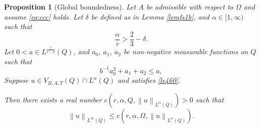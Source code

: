 \documentclass[11pt, a4paper]{article}
\newtheorem{proposition}[theorem]{Proposition}%
\numberwithin{equation}{section}
\newcommand{\norm}[1]{\left\lVert #1\right\rVert}
\begin{document}
 \begin{proposition}[Global boundedness]
Let $A$ be  admissible with respect to $\Omega$ and assume
\eqref{eq:ccc} holds. Let $\delta$ be defined as in Lemma
\ref{lemfs1b}, and $\alpha \in [1,\infty)$ such that 
\begin{equation}
\frac{\alpha}{\overline{r}}> \frac{2}{3}-\delta.
\label{cc9}
\end{equation}
Let $0 < a\in L^{\frac{\overline{r}}{\overline{r}-2}}(Q)$, and $a_{0}$, $a_{1}$, $a_{2}$ be
non-negative measurable functions on $Q$ such that
\begin{equation}
b^{-1} a_{0}^{2}+a_{1}+ a_{2}\le a,
\label{cc8}
 \end{equation}
Suppose $u\in V_{B,A,T}(Q)\cap L^{\alpha}(Q)$ and satisfies  \eqref{le460}.

Then there exists a real number
$c\left(r,\alpha,Q,\norm{u}_{L^{\alpha}(Q)} \right) > 0$ such that
\begin{equation}
  \norm{u}_{L^{\infty}(Q)}\le c \left(r,\alpha,\Omega,\norm{u}_{L^{\alpha}(Q)} \right). \label{le460abc}
 \end{equation}
 \label{pro46}
\end{proposition}
\end{document}
